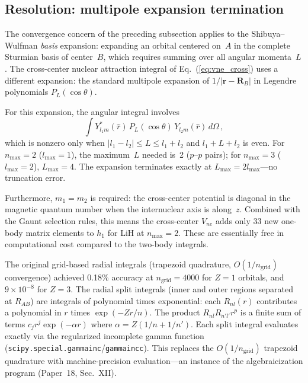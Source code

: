 \documentclass[aps,pra,twocolumn,superscriptaddress,longbibliography]{revtex4-2}
\begin{document}
\subsection{Resolution: multipole expansion termination}
\label{sec:multipole_resolution}

The convergence concern of the preceding subsection applies to the
Shibuya--Wulfman \emph{basis} expansion: expanding an orbital
centered on~$A$ in the complete Sturmian basis of center~$B$, which
requires summing over all angular momenta~$L$.  The cross-center
nuclear attraction integral of Eq.~(\ref{eq:vne_cross}) uses a
different expansion: the standard multipole expansion of
$1/|\mathbf{r}-\mathbf{R}_B|$ in Legendre polynomials $P_L(\cos\theta)$.

For this expansion, the angular integral involves
\begin{equation}
\int Y_{l_1 m}^*(\hat{r})\, P_L(\cos\theta)\, Y_{l_2 m}(\hat{r})\, d\Omega\,,
\end{equation}
which is nonzero only when $|l_1 - l_2| \le L \le l_1 + l_2$ and
$l_1 + L + l_2$ is even.  For $n_{\max} = 2$ ($l_{\max} = 1$), the
maximum~$L$ needed is~2 ($p$--$p$ pairs); for $n_{\max} = 3$
($l_{\max} = 2$), $L_{\max} = 4$.  The expansion terminates exactly
at $L_{\max} = 2 l_{\max}$---no truncation error.

Furthermore, $m_1 = m_2$ is required: the cross-center potential is
diagonal in the magnetic quantum number when the internuclear axis is
along~$z$.  Combined with the Gaunt selection rules, this means the
cross-center $V_{ne}$ adds only 33 new one-body matrix elements to
$h_1$ for LiH at $n_{\max} = 2$.  These are essentially free in
computational cost compared to the two-body integrals.

The original grid-based radial integrals (trapezoid quadrature,
$O(1/n_{\mathrm{grid}})$ convergence) achieved 0.18\% accuracy at
$n_{\mathrm{grid}} = 4000$ for $Z = 1$ orbitals, and $9 \times 10^{-8}$
for $Z = 3$.  The radial split integrals (inner and outer regions
separated at $R_{AB}$) are integrals of polynomial times exponential:
each $R_{nl}(r)$ contributes a polynomial in $r$ times
$\exp(-Zr/n)$.  The product $R_{nl} R_{n'l'} r^p$ is a finite sum of
terms $c_j r^j \exp(-\alpha r)$ where $\alpha = Z(1/n + 1/n')$.
Each split integral evaluates exactly via the regularized incomplete
gamma function (\texttt{scipy.special.gammainc}/\texttt{gammaincc}).
This replaces the $O(1/n_{\mathrm{grid}})$ trapezoid quadrature with
machine-precision evaluation---an instance of the algebraicization
program (Paper~18, Sec.~XII).
\end{document}
